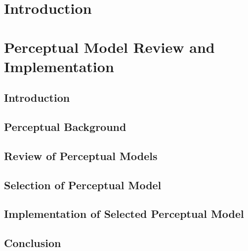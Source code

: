 \documentclass[10pt,twoside,openright,titlepage]{ce}
\begin{document}
\frontmatter
\makecover
\maketitle
\makesignature


\tableofcontents
\mainmatter

\chapter{Introduction}
\label{ch:introduction}

\newpage


\chapter{Perceptual Model Review and Implementation}
\label{ch:perceptual}
\section{Introduction}
\label{ch:perceptual:introduction}

\newpage
\section{Perceptual Background}
\label{ch:perceptual:background}

\newpage
\section{Review of Perceptual Models}
\label{ch:perceptual:review}

\newpage
\section{Selection of Perceptual Model}
\label{ch:perceptual:selection}

\newpage
\section{Implementation of Selected Perceptual Model}
\label{ch:perceptual:implementation}

\newpage
\section{Conclusion}
\label{ch:perceptual:conclusion}

\end{document}
